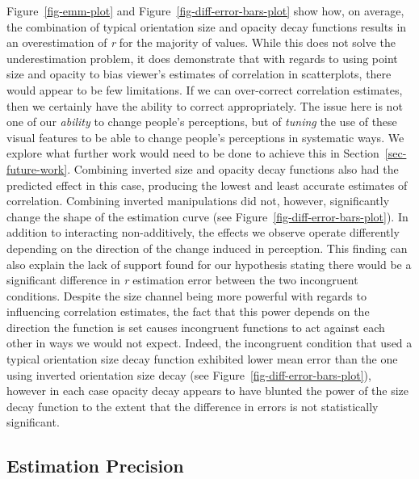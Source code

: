 \documentclass[sigconf]{acmart}
\begin{document}
Figure~\ref{fig-emm-plot} and Figure~\ref{fig-diff-error-bars-plot} show
how, on average, the combination of typical orientation size and opacity
decay functions results in an overestimation of \emph{r} for the
majority of values. While this does not solve the underestimation
problem, it does demonstrate that with regards to using point size and
opacity to bias viewer's estimates of correlation in scatterplots, there
would appear to be few limitations. If we can over-correct correlation
estimates, then we certainly have the ability to correct appropriately.
The issue here is not one of our \emph{ability} to change people's
perceptions, but of \emph{tuning} the use of these visual features to be
able to change people's perceptions in systematic ways. We explore what
further work would need to be done to achieve this in
Section~\ref{sec-future-work}. Combining inverted size and opacity decay
functions also had the predicted effect in this case, producing the
lowest and least accurate estimates of correlation. Combining inverted
manipulations did not, however, significantly change the shape of the
estimation curve (see Figure~\ref{fig-diff-error-bars-plot}). In
addition to interacting non-additively, the effects we observe operate
differently depending on the direction of the change induced in
perception. This finding can also explain the lack of support found for
our hypothesis stating there would be a significant difference in
\emph{r} estimation error between the two incongruent conditions.
Despite the size channel being more powerful with regards to influencing
correlation estimates, the fact that this power depends on the direction
the function is set causes incongruent functions to act against each
other in ways we would not expect. Indeed, the incongruent condition
that used a typical orientation size decay function exhibited lower mean
error than the one using inverted orientation size decay (see
Figure~\ref{fig-diff-error-bars-plot}), however in each case opacity
decay appears to have blunted the power of the size decay function to
the extent that the difference in errors is not statistically
significant.

\hypertarget{sec-precision}{%
\subsection{Estimation Precision}\label{sec-precision}}
\end{document}
